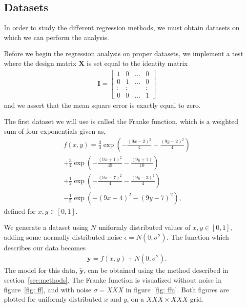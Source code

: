 \documentclass[reprint,english,notitlepage]{revtex4-1}  %
\begin{document}
\subsection{Datasets}
In order to study the different regression methods, we must obtain datasets on which we can perform the analysis. 

Before we begin the regression analysis on proper datasets, we implement a test where the design matrix $\mathbf{X}$ is set equal to the identity matrix 
\begin{align}\label{eq: identity_matrix}
    \mathbf{I} = 
    \begin{bmatrix} 
    1 & 0 & ... & 0 \\ 
    0 & 1 & ... & 0 \\ 
    : & : &     & : \\ 
    0 & 0 & ... & 1 
    \end{bmatrix}
\end{align}
and we assert that the mean square error is exactly equal to zero. %

The first dataset we will use is called the Franke function, which is a weighted sum of four exponentials given as, 
\begin{align}\label{eq: frankie}
    f(x,y) = \frac{3}{4} \exp\left(
             -\frac{{\left( 9x-2\right)}^2}{4}
             -\frac{{\left( 9y-2\right)}^2}{4}
             \right) 
             \\ 
            +\frac{3}{4} \exp\left(
             -\frac{{\left( 9x+1\right)}^2}{49}
             -\frac{{\left( 9y+1\right)}}{10}
             \right) \nonumber
             \\ 
            +\frac{1}{2} \exp\left(
             -\frac{{\left( 9x-7\right)}^2}{4}
             -\frac{{\left( 9y-3\right)}^2}{4}
             \right) \nonumber
             \\ 
            -\frac{1}{5} \exp\left(
            -{\left(9x-4\right)}^2 - {\left(9y-7\right)}^2
             \right), \nonumber
\end{align}
defined for $x,y\in [0,1]$. 

We generate a dataset using $N$ uniformly distributed values of $x,y\in[0,1]$, adding some normally distributed noise $\epsilon = N(0, \sigma^2)$. The function which describes our data becomes 
\begin{align}
    \boldsymbol{y} = f(x,y) + N(0, \sigma^2). 
\end{align}
The model for this data, $\boldsymbol{\tilde{y}}$, can be obtained using the method described in section~\ref{sec:methods}. The Franke function is visualized without noise in figure~\ref{fig: ff}, and with noise $\sigma = XXX$ in figure~\ref{fig: ffn}. Both figures are plotted for uniformly distributed $x$ and $y$, on a $XXX \times XXX$ grid. 
\end{document}
